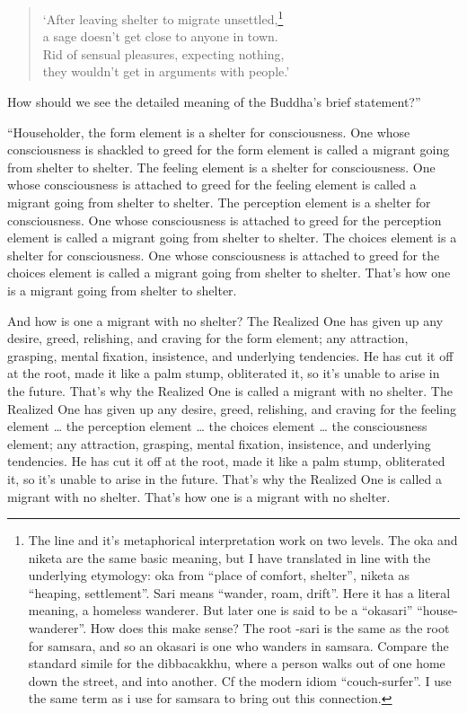 \documentclass[12pt,openany]{book}%
\begin{document}
\begin{verse}%
‘After leaving shelter to migrate unsettled,\footnote{The line and it’s metaphorical interpretation work on two levels. The oka and niketa are the same basic meaning, but I have translated in line with the underlying etymology: oka from “place of comfort, shelter”, niketa as “heaping, settlement”. Sari means “wander, roam, drift”. Here it has a literal meaning, a homeless wanderer. But later one is said to be a “okasari” “house-wanderer”. How does this make sense? The root -sari is the same as the root for samsara, and so an okasari is one who wanders in samsara. Compare the standard simile for the dibbacakkhu, where a person walks out of one home down the street, and into another. Cf the modern idiom “couch-surfer”. I use the same term as i use for samsara to bring out this connection. } \\
a sage doesn’t get close to anyone in town. \\
Rid of sensual pleasures, expecting nothing, \\
they wouldn’t get in arguments with people.’ 

%
\end{verse}

How should we see the detailed meaning of the Buddha’s brief statement?” 

“Householder, the form element is a shelter for consciousness. One whose consciousness is shackled to greed for the form element is called a migrant going from shelter to shelter. The feeling element is a shelter for consciousness. One whose consciousness is attached to greed for the feeling element is called a migrant going from shelter to shelter. The perception element is a shelter for consciousness. One whose consciousness is attached to greed for the perception element is called a migrant going from shelter to shelter. The choices element is a shelter for consciousness. One whose consciousness is attached to greed for the choices element is called a migrant going from shelter to shelter. That’s how one is a migrant going from shelter to shelter. 

And how is one a migrant with no shelter? The Realized One has given up any desire, greed, relishing, and craving for the form element; any attraction, grasping, mental fixation, insistence, and underlying tendencies. He has cut it off at the root, made it like a palm stump, obliterated it, so it’s unable to arise in the future. That’s why the Realized One is called a migrant with no shelter. The Realized One has given up any desire, greed, relishing, and craving for the feeling element … the perception element … the choices element … the consciousness element; any attraction, grasping, mental fixation, insistence, and underlying tendencies. He has cut it off at the root, made it like a palm stump, obliterated it, so it’s unable to arise in the future. That’s why the Realized One is called a migrant with no shelter. That’s how one is a migrant with no shelter. 
\end{document}
